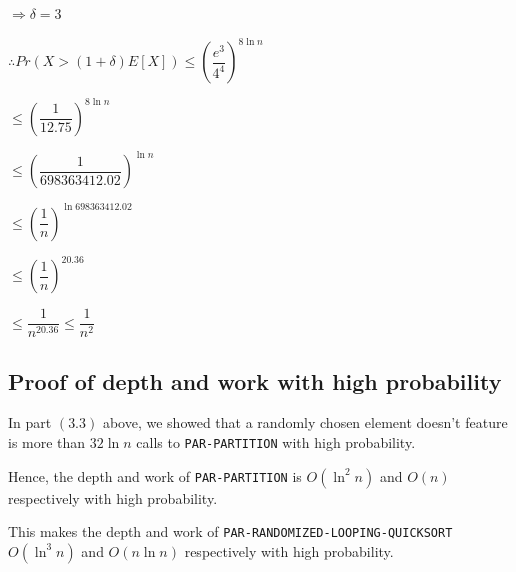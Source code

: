 \documentclass{article}
\begin{document}
$\Rightarrow \delta = 3$

$\therefore Pr(X > (1 + \delta)E[X]) \le 
\left(\dfrac{e^3}{4^4}\right)^{8\ln{n}}$

$\le \left(\dfrac{1}{12.75}\right)^{8\ln{n}}$

$\le \left(\dfrac{1}{698363412.02}\right)^{\ln{n}}$

$\le \left(\dfrac{1}{n}\right)^{\ln{698363412.02}}$

$\le \left(\dfrac{1}{n}\right)^{20.36}$

$\le \dfrac{1}{n^{20.36}} \le \dfrac{1}{n^{2}}$

\subsection{Proof of depth and work with high probability}

In part $(3.3)$ above, we showed that a randomly chosen element
doesn't feature is more than $32\ln{n}$ calls to
\texttt{PAR-PARTITION} with high probability.

Hence, the depth and work of \texttt{PAR-PARTITION} is $O(\ln^2{n})$
and $O(n)$ respectively with high probability.

This makes the depth and work of
\texttt{PAR-RANDOMIZED-LOOPING-QUICKSORT} $O(\ln^3{n})$ and
$O(n\ln{n})$ respectively with high probability.
\end{document}
